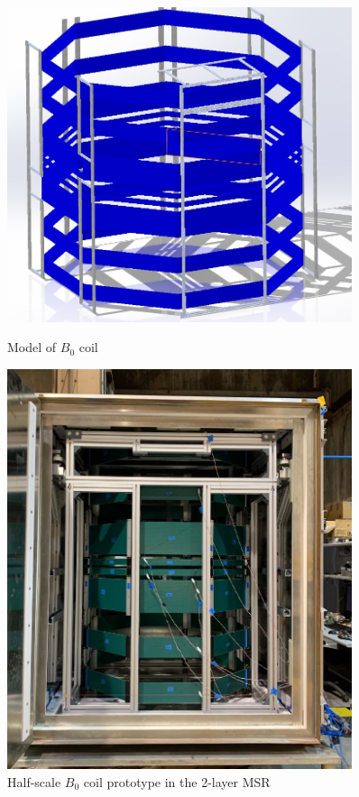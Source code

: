 \begin{figure}
\centering
\begin{minipage}{.5\textwidth}
    \centering
    \includegraphics[width=0.9\textwidth]{figures/B0-model.png}
    \caption
    {Model of $B_0$ coil}
    \label{fig:b0-coil-model}
\end{minipage}%
\begin{minipage}{.5\textwidth}
    \centering
    \includegraphics[width=0.9\textwidth]{figures/half-scale-B0.png}
    \caption
    {Half-scale $B_0$ coil prototype in the 2-layer MSR}
    \label{fig:b0-half-scale}
\end{minipage}
\end{figure}

